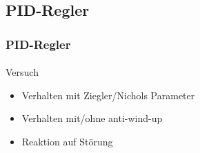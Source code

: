 \subsection{PID-Regler} %
\label{sub:PID-Regler}
\begin{frame}
    \frametitle{PID-Regler}
    \framesubtitle{}
    \begin{block}{Versuch}
         \begin{itemize}
             \item Verhalten mit Ziegler/Nichols Parameter
             \item Verhalten mit/ohne anti-wind-up
             \item Reaktion auf Störung
         \end{itemize}
    \end{block}
\end{frame}
